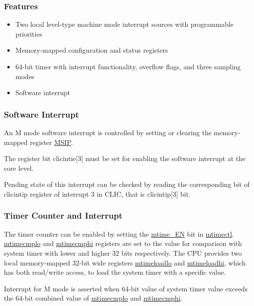 \documentclass[main\_\_EN.tex]{subfiles}
\begin{document}
\subsubsection{Features}
\begin{itemize}
    \item Two local level-type machine mode interrupt sources with programmable priorities
    \item Memory-mapped configuration and status registers
    \item 64-bit timer with interrupt functionality, overflow flags, and three sampling modes
    \item Software interrupt
\end{itemize}

\subsubsection{Software Interrupt}
\label{sec:riscvcpu-clint-software}

An M mode software interrupt is controlled by setting or clearing the memory-mapped register \hyperref[regdesc:CLINTMSIPREG]{MSIP}.

The register bit clicintie[3] must be set for enabling the software interrupt at the core level.

Pending state of this interrupt can be checked by reading the corresponding bit of clicintip register of interrupt 3 in CLIC, that is clicintip[3] bit.


\subsubsection{Timer Counter and Interrupt}
\label{sec:riscvcpu-clint-timer}

The timer counter can be enabled by setting the \hyperref[fielddesc:CLINTMTIMECTLEN]{mtime\_EN} bit in  \hyperref[regdesc:CLINTMTIMECTLREG]{mtimectl}.
\hyperref[regdesc:CLINTMTIMECMPLOREG]{mtimecmplo} and \hyperref[regdesc:CLINTMTIMECMPHIREG]{mtimecmphi} registers are set to the value for comparison with system timer with lower and higher 32 bits respectively.
The CPU provides two local memory-mapped 32-bit wide registers \hyperref[regdesc:CLINTMTIMELOADLOREG]{mtimeloadlo} and \hyperref[regdesc:CLINTMTIMELOADHIREG]{mtimeloadhi}, which has both read/write access, to load the system timer with a specific value.

Interrupt for M mode is asserted when 64-bit value of system timer value exceeds the 64-bit combined value of \hyperref[regdesc:CLINTMTIMECMPLOREG]{mtimecmplo} and \hyperref[regdesc:CLINTMTIMECMPHIREG]{mtimecmphi}.
\end{document}
